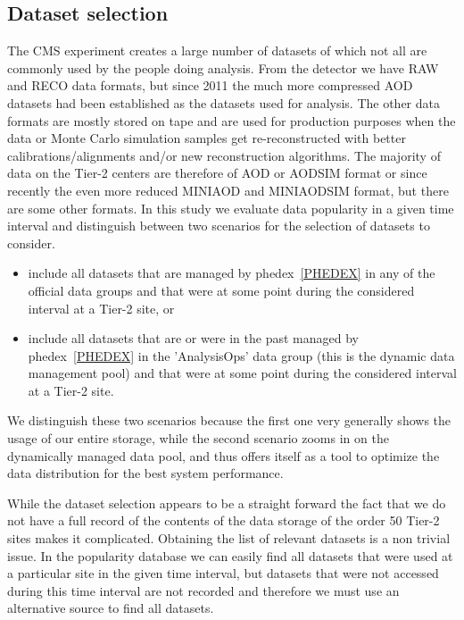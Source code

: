 \subsection{Dataset selection}

The CMS experiment creates a large number of datasets of which not all are
commonly used by the people doing analysis. From the detector we have RAW and
RECO data formats, but since 2011 the much more compressed AOD datasets had been
established as the datasets used for analysis. The other data formats are mostly
stored on tape and are used for production purposes when the data or Monte Carlo
simulation samples get re-reconstructed with better calibrations/alignments
and/or new reconstruction algorithms. The majority of data on the Tier-2 centers
are therefore of AOD or AODSIM format or since recently the even more reduced
MINIAOD and MINIAODSIM format, but there are some other formats. In this study
we evaluate data popularity in a given time interval and distinguish between two
scenarios for the selection of datasets to consider.
%
\begin{itemize}
\item include all datasets that are managed by phedex~\ref{PHEDEX} in any of the
   official data groups and that were at some point during the considered
   interval at a Tier-2 site, or
\item include all datasets that are or were in the past managed by
   phedex~\ref{PHEDEX} in the 'AnalysisOps' data group (this is the dynamic
   data management pool) and that were at some point during the considered
   interval at a Tier-2 site.
\end{itemize}

We distinguish these two scenarios because the first one very generally shows
the usage of our entire storage, while the second scenario zooms in on the
dynamically managed data pool, and thus offers itself as a tool to optimize the
data distribution for the best system performance.

While the dataset selection appears to be a straight forward the fact that we do
not have a full record of the contents of the data storage of the order 50
Tier-2 sites makes it complicated. Obtaining the list of relevant datasets is a
non trivial issue. In the popularity database we can easily find all datasets
that were used at a particular site in the given time interval, but datasets
that were not accessed during this time interval are not recorded and therefore
we must use an alternative source to find all datasets.


